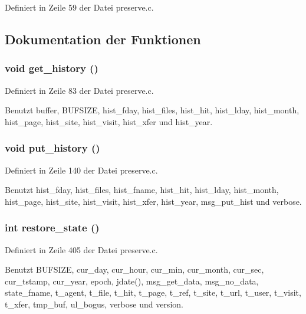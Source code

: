 Definiert in Zeile 59 der Datei preserve.c.

\subsection{Dokumentation der Funktionen}
\subsubsection{\setlength{\rightskip}{0pt plus 5cm}void get\_\-history ()}\label{preserve_8c_d7ce84df67f8fe6fb2ae68f70445e3ff}




Definiert in Zeile 83 der Datei preserve.c.

Benutzt buffer, BUFSIZE, hist\_\-fday, hist\_\-files, hist\_\-hit, hist\_\-lday, hist\_\-month, hist\_\-page, hist\_\-site, hist\_\-visit, hist\_\-xfer und hist\_\-year.
\subsubsection{\setlength{\rightskip}{0pt plus 5cm}void put\_\-history ()}\label{preserve_8c_0725425e14f501da1e2fc612d7854c01}




Definiert in Zeile 140 der Datei preserve.c.

Benutzt hist\_\-fday, hist\_\-files, hist\_\-fname, hist\_\-hit, hist\_\-lday, hist\_\-month, hist\_\-page, hist\_\-site, hist\_\-visit, hist\_\-xfer, hist\_\-year, msg\_\-put\_\-hist und verbose.
\subsubsection{\setlength{\rightskip}{0pt plus 5cm}int restore\_\-state ()}\label{preserve_8c_87684b62a3f6bfdc76f25d5fb679c901}




Definiert in Zeile 405 der Datei preserve.c.

Benutzt BUFSIZE, cur\_\-day, cur\_\-hour, cur\_\-min, cur\_\-month, cur\_\-sec, cur\_\-tstamp, cur\_\-year, epoch, jdate(), msg\_\-get\_\-data, msg\_\-no\_\-data, state\_\-fname, t\_\-agent, t\_\-file, t\_\-hit, t\_\-page, t\_\-ref, t\_\-site, t\_\-url, t\_\-user, t\_\-visit, t\_\-xfer, tmp\_\-buf, ul\_\-bogus, verbose und version.
